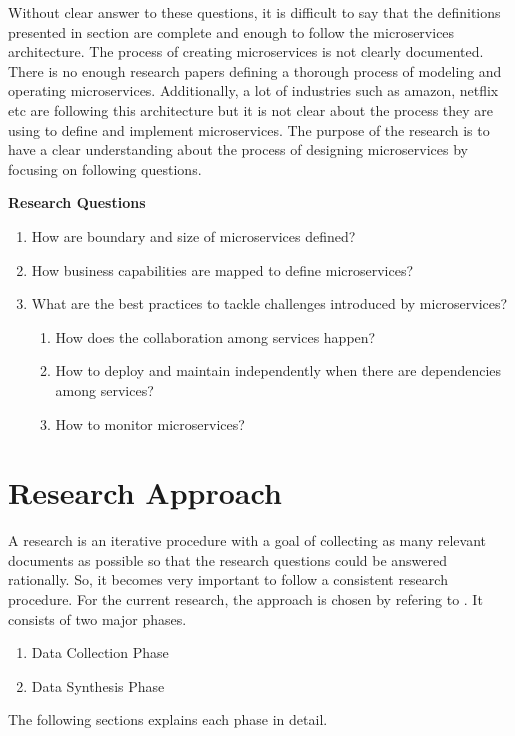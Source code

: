 Without clear answer to these questions, it is difficult to say that the definitions presented in section are complete and enough to follow the microservices architecture. The process of creating microservices is not clearly documented. There is no enough research papers defining a thorough process of modeling and operating microservices. Additionally, a lot of industries such as amazon, netflix etc are following this architecture but it is not clear about the process they are using to define and implement microservices. The purpose of the research is to have a clear understanding about the process of designing microservices by focusing on following questions.
\begin{shaded}
\textbf{Research Questions}\label{list:introduction/research_questions}
\end{shaded}
\begin{enumerate}
\item How are boundary and size of microservices defined?
\item How business capabilities are mapped to define microservices?
\item What are the best practices to tackle challenges introduced by microservices?
    \begin{enumerate}
    \item How does the collaboration among services happen?
    \item How to deploy and maintain independently when there are dependencies among services?
    \item How to monitor microservices?
    \end{enumerate}
\end{enumerate}
\section{Research Approach}\label{section:context/approach}
A research is an iterative procedure with a goal of collecting as many relevant documents as possible so that the research questions could be answered rationally. So, it becomes very important to follow a consistent research procedure. For the current research, the approach is chosen by refering to \cite{np:2007aa}. It consists of two major phases.
\begin{enumerate}
\item {Data Collection Phase}
\item {Data Synthesis Phase}
\end{enumerate}
The following sections explains each phase in detail.
